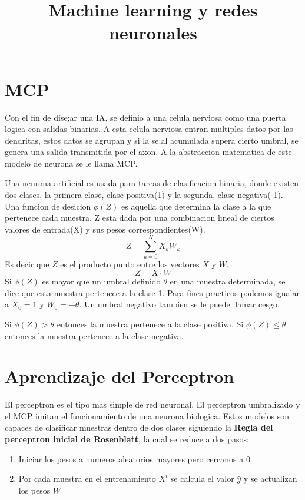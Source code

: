 \documentclass{article}
\title{Machine learning y redes neuronales}
\date{}
\begin{document}
\maketitle
\section{MCP}

Con el fin de dise;ar una IA, se definio a una celula nerviosa como una puerta logica con salidas binarias. A esta celula nerviosa entran multiples datos por las dendritas, estos datos se agrupan y si la se;al acumulada supera
cierto umbral, se genera una salida transmitida por el axon. A la abstraccion matematica de este modelo de neurona se le llama MCP.

Una neurona artificial es usada para tareas de clasificacion binaria, donde existen dos clases, la primera clase, clase positiva(1) y la segunda, clase negativa(-1).\\
Una funcion de desicion \(\phi(Z)\) es aquella que determina la clase a la que pertenece cada muestra. Z esta dada por una combinacion lineal de ciertos valores de entrada(X) y sus pesos correspondientes(W).                                                                   
\[
  Z = \sum_{k=0}^{N} X_k W_k 
\]
Es decir que \(Z\) es el producto punto entre los vectores \(X\) y \(W\).
  \[ 
  Z = X \cdot W
  \]
Si \(\phi(Z)\) es mayor que un umbral definido \(\theta\) en una muestra determinada, se dice que esta muestra pertenece a la clase 1. Para fines practicos podemos igualar a \(X_0 = 1\) y \(W_0 = -\theta\).
Un umbral negativo tambien se le puede llamar cesgo.

Si \(\phi(Z) > \theta\) entonces la muestra pertenece a la clase positiva.
Si \(\phi(Z) \leq \theta\) entonces la muestra pertenece a la clase negativa.

\section{Aprendizaje del Perceptron}

El perceptron es el tipo mas simple de red neuronal. El perceptron umbralizado y el MCP imitan el funcionamiento de una neurona biologica. Estos modelos son capaces de clasificar muestras dentro de dos clases siguiendo la
\textbf{Regla del perceptron inicial de Rosenblatt}, la cual se reduce a dos pasos:

\begin{enumerate}
  \item Iniciar los pesos a numeros aleatorios mayores pero cercanos a 0 
  \item Por cada muestra en el entrenamiento \(X^i\) se calcula el valor \(\hat{y}\) y se actualizan los pesos \(W\)
\end{enumerate}
\end{document}
